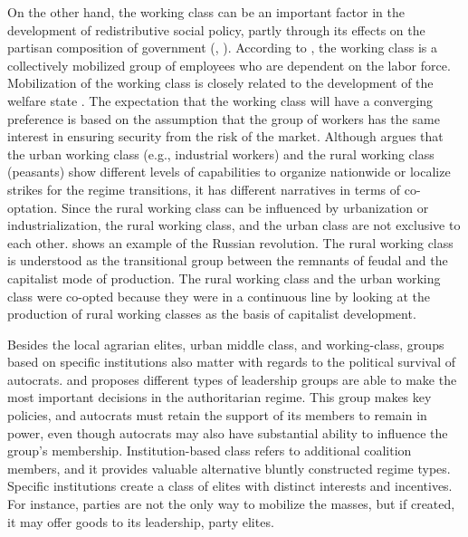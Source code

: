 \documentclass[11pt, notitlepage]{article}
\begin{document}
On the other hand, the working class can be an important factor in the development of redistributive social policy, partly through its effects on the partisan composition of government (\citealp{HuberStephens2001}, \citealp[794]{Rasmussen2018}). According to \citet[175]{Korpi2006}, the working class is a collectively mobilized group of employees who are dependent on the labor force. Mobilization of the working class is closely related to the development of the welfare state \citep{Shalev1983}. The expectation that the working class will have a converging preference is based on the assumption that the group of workers has the same interest in ensuring security from the risk of the market. Although \citet[1495]{Dahlum2019} argues that the urban working class (e.g., industrial workers) and the rural working class (peasants) show different levels of capabilities to organize nationwide or localize strikes for the regime transitions, it has different narratives in terms of co-optation. Since the rural working class can be influenced by urbanization or industrialization, the rural working class, and the urban class are not exclusive to each other. \citet[1932]{Chandra2002} shows an example of the Russian revolution. The rural working class is understood as the transitional group between the remnants of feudal and the capitalist mode of production. The rural working class and the urban working class were co-opted because they were in a continuous line by looking at the production of rural working classes as the basis of capitalist development. 

Besides the local agrarian elites, urban middle class, and working-class, groups based on specific institutions also matter with regards to the political survival of autocrats. \citet{Geddes1999} and \citet{Geddes2014} proposes different types of leadership groups are able to make the most important decisions in the authoritarian regime. This group makes key policies, and autocrats must retain the support of its members to remain in power, even though autocrats may also have substantial ability to influence the group's membership. Institution-based class refers to additional coalition members, and it provides valuable alternative bluntly constructed regime types. Specific institutions create a class of elites with distinct interests and incentives. For instance, parties are not the only way to mobilize the masses, but if created, it may offer goods to its leadership, party elites. 
\end{document}
